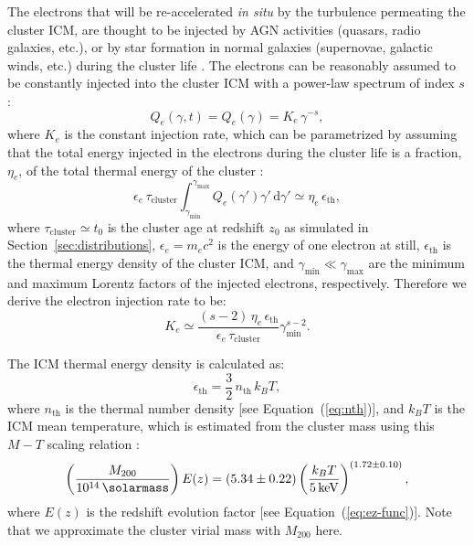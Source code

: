 \documentclass[modern]{aastex61}
\newcommand{\R}[1]{\mathrm{#1}}
\newcommand{\D}[1]{\R{d} #1}
\begin{document}
The electrons that will be re-accelerated \emph{in situ}
by the turbulence permeating the cluster ICM, are thought to be
injected by AGN activities (quasars, radio galaxies, etc.), or by
star formation in normal galaxies (supernovae, galactic winds, etc.)
during the cluster life \citep[see][for a review]{blasi2007rev}.
The electrons can be reasonably assumed to be constantly injected
into the cluster ICM with a power-law spectrum of index $s$
\citep{cassano2005,sarazin1999}:
\begin{equation}
  \label{eq:electron-inj}
  Q_e(\gamma, t) = Q_e(\gamma) = K_e \,\gamma^{-s},
\end{equation}
where $K_e$ is the constant injection rate,
\color{magenta}
which can be parametrized
by assuming that the total energy injected in the electrons during
the cluster life is a fraction, $\eta_e$, of the total thermal energy
of the cluster \citep{cassano2005}:
\begin{equation}
  \label{eq:injrate-param}
  \epsilon_e \,\tau_{\R{cluster}} \int_{\gamma_{\R{min}}}^{\gamma_{\R{max}}}
  Q_e(\gamma') \gamma' \,\D{\gamma'} \simeq \eta_e \,\epsilon_{\R{th}},
\end{equation}
where $\tau_{\R{cluster}} \simeq t_0$ is the cluster age at redshift
$z_0$ as simulated in Section~\ref{sec:distributions},
$\epsilon_e = m_e c^2$ is the energy of one electron at still,
$\epsilon_{\R{th}}$ is the thermal energy density of the cluster ICM,
and $\gamma_{\R{min}} \ll \gamma_{\R{\max}}$ are the minimum and maximum
Lorentz factors of the injected electrons, respectively.
Therefore we derive the electron injection rate to be:
\begin{equation}
  \label{eq:injrate}
  K_e \simeq \frac{(s-2)\,\eta_e\,\epsilon_{\R{th}}}{\epsilon_e\,\tau_{\R{cluster}}}
    \gamma_{\R{min}}^{s-2}.
\end{equation}
\color{black}

The ICM thermal energy density is calculated as:
\begin{equation}
  \label{eq:eth}
  \epsilon_{\R{th}} = \frac{3}{2} \,n_{\R{th}} \,k_B T,
\end{equation}
where $n_{\R{th}}$ is the thermal number density [see Equation~(\ref{eq:nth})],
and $k_B T$ is the ICM mean temperature, which is estimated
from the cluster mass using this $M \!-\! T$ scaling relation
\citep{arnaud2005}:
\begin{equation}
  \label{eq:mt-relation}
  \left( \frac{M_{200}}{\SI{e14}{\solarmass}} \right) E(z) = (5.34 \pm 0.22)
  \left( \frac{k_B T}{\SI{5}{\keV}} \right)^{(1.72 \pm 0.10)},
\end{equation}
where $E(z)$ is the redshift evolution factor [see Equation~(\ref{eq:ez-func})].
Note that we approximate the cluster virial mass with $M_{200}$ here.
\end{document}
